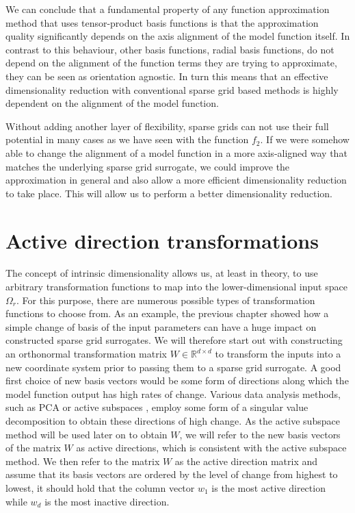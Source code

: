 \documentclass[
  a4paper,  %
  twoside,  %
  bibliography=totoc,
  headsepline,
  cleardoublepage=empty,
  parskip=half,
  draft=false
]{scrbook}
\begin{document}
We can conclude that a fundamental property of any function approximation method that uses tensor-product basis functions is that the approximation quality significantly depends on the axis alignment of the model function itself.
In contrast to this behaviour, other basis functions, \eg radial basis functions, do not depend on the alignment of the function terms they are trying to approximate, \ie they can be seen as orientation agnostic.
In turn this means that an effective dimensionality reduction with conventional sparse grid based methods is highly dependent on the alignment of the model function.

Without adding another layer of flexibility, sparse grids can not use their full potential in many cases as we have seen with the function $f_2$.
If we were somehow able to change the alignment of a model function in a more axis-aligned way that matches the underlying sparse grid surrogate, we could improve the approximation in general and also allow a more efficient dimensionality reduction to take place.
This will allow us to perform a better dimensionality reduction.

\section{Active direction transformations}

The concept of intrinsic dimensionality allows us, at least in theory, to use arbitrary transformation functions to map into the lower-dimensional input space $\Omega_r$.
For this purpose, there are numerous possible types of transformation functions to choose from.
As an example, the previous chapter showed how a simple change of basis of the input parameters can have a huge impact on constructed sparse grid surrogates.
We will therefore start out with constructing an orthonormal transformation matrix $W \in \mathds{R}^{d \times d}$ to transform the inputs into a new coordinate system prior to passing them to a sparse grid surrogate.
A good first choice of new basis vectors would be some form of directions along which the model function output has high rates of change.
Various data analysis methods, such as PCA \cite{Abdi2010} or active subspaces \cite{Constantine2015}, employ some form of a singular value decomposition to obtain these directions of high change.
As the active subspace method will be used later on to obtain $W$, we will refer to the new basis vectors of the matrix $W$ as active directions, which is consistent with the active subspace method.
We then refer to the matrix $W$ as the active direction matrix and assume that its basis vectors are ordered by the level of change from highest to lowest, \ie it should hold that the column vector $w_1$ is the most active direction while $w_d$ is the most inactive direction.
\end{document}
